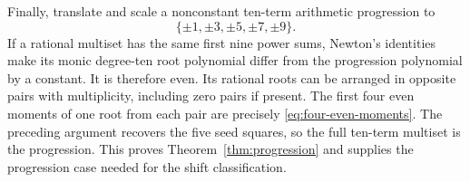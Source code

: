 Finally, translate and scale a nonconstant ten-term arithmetic
progression to
\[\{\pm1,\pm3,\pm5,\pm7,\pm9\}.\]
If a rational
multiset has the same first nine power sums, Newton's identities make
its monic degree-ten root polynomial differ from the progression
polynomial by a constant. It is therefore even. Its rational roots
can be arranged in opposite pairs with multiplicity, including zero
pairs if present. The first four even moments of one root from each
pair are precisely \eqref{eq:four-even-moments}. The preceding argument
recovers the five seed squares, so the full ten-term multiset is the
progression. This proves Theorem~\ref{thm:progression} and supplies the
progression case needed for the shift classification.
